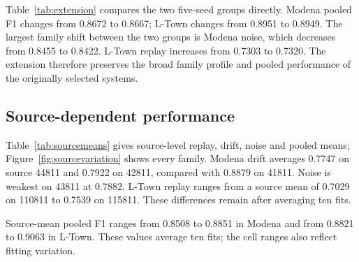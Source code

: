 
Table~\ref{tab:extension} compares the two five-seed groups directly. Modena pooled F1 changes from 0.8672 to 0.8667; L-Town changes from 0.8951 to 0.8949. The largest family shift between the two groups is Modena noise, which decreases from 0.8455 to 0.8422. L-Town replay increases from 0.7303 to 0.7320. The extension therefore preserves the broad family profile and pooled performance of the originally selected systems.



\subsection{Source-dependent performance}
\label{sec:sourceperformance}
Table~\ref{tab:sourcemeans} gives source-level replay, drift, noise and pooled means; Figure~\ref{fig:sourcevariation} shows every family. Modena drift averages 0.7747 on source 44811 and 0.7922 on 42811, compared with 0.8879 on 41811. Noise is weakest on 43811 at 0.7882. L-Town replay ranges from a source mean of 0.7029 on 110811 to 0.7539 on 115811. These differences remain after averaging ten fits.

\begingroup
\let\originaltable\table
\renewcommand{\table}[1][]{\originaltable[!htbp]}

\endgroup
{}

Source-mean pooled F1 ranges from 0.8508 to 0.8851 in Modena and from 0.8821 to 0.9063 in L-Town. These values average ten fits; the cell ranges also reflect fitting variation.





